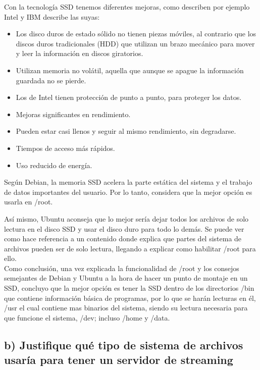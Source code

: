 	Con la tecnología SSD tenemos diferentes mejoras, como describen por ejemplo  Intel\cite{treintaycuatro} y IBM\cite{treintaycinco} describe las suyas:
	
	\begin{itemize}
		\item Los disco duros de estado sólido no tienen piezas móviles, al contrario que los discos duros tradicionales (HDD) que utilizan un brazo mecánico para mover y leer la información en discos giratorios.
		\item Utilizan memoria no volátil, aquella que aunque se apague la información guardada no se pierde.
		\item Los de Intel tienen protección de punto a punto, para proteger los datos.
		\item Mejoras significantes en rendimiento.
		\item Pueden estar casi llenos y seguir al mismo rendimiento, sin degradarse.
		\item Tiempos de acceso más rápidos.
		\item Uso reducido de energía.
	\end{itemize}
	
	Según Debian\cite{treintayseis}, la memoria SSD acelera la parte estática del sistema y el trabajo de datos importantes del usuario. Por lo tanto, considera que la mejor opción es usarla en /root.
	
	Así mismo, Ubuntu\cite{treintaysiete} aconseja que lo mejor sería dejar todos los archivos de solo lectura en el disco SSD y usar el disco duro para todo lo demás. Se puede ver como hace referencia a un contenido donde explica que partes del sistema de archivos pueden ser de solo lectura, llegando a explicar como habilitar /root para ello.
	\\
	
	Como conclusión, una vez explicada la funcionalidad de /root y los consejos semejantes de Debian y Ubuntu a la hora de hacer un punto de montaje en un SSD, concluyo que la mejor opción\cite{treintayocho} es tener la SSD dentro de los directorios /bin que contiene información básica de programas, por lo que se harán lecturas en él, /usr el cual contiene mas binarios del sistema, siendo su lectura necesaria para que funcione el sistema, /dev; incluso /home y /data. 
	
	\subsection{b) Justifique qué tipo de sistema de archivos usaría para tener un servidor de streaming}
	
